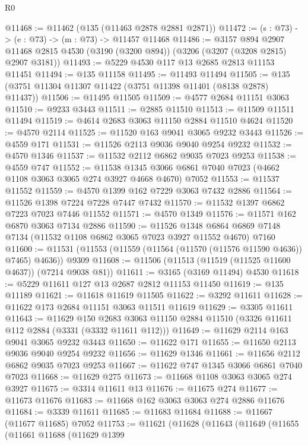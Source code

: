 \begin{lexlean}{R0}
\begin{coremodule}
@11468 := @11462 (@135 (@11463 @2878 @2881 @2871))
@11472 := (s : @73) -> (e : @73) -> (m : @73) -> @11457 @11468
@11486 := @3157
    @894
    @2907
    @11468
    @2815
    @4530
    (@3190 (@3200 @894))
    (@3206 (@3207 (@3208 @2815) @2907 @3181))
@11493 := @5229 @4530 @117 @13 @2685 @2813 @11153 @11451
@11494 := @135 @11158
@11495 := @11493 @11494
@11505 := @135 (@3751 @11304 @11307 @11422 (@3751 @11398 @11401 (@8138 @2878) @11437))
@11506 := @11495 @11505
@11509 := @4577 @2684 @11151 @3063
@11510 := @9233 @3443
@11511 := @2885 @11510
@11513 := @11509 @11511 @11494
@11519 := @4614 @2683 @3063 @11150 @2884 @11510 @4624
@11520 := @4570 @2114
@11525 := @11520 @163 @9041 @3065 @9232 @3443
@11526 := @4559 @171
@11531 := @11526 @2113 @9036 @9040 @9254 @9232
@11532 := @4570 @1346
@11537 := @11532 @2112 @6862 @9035 @7023 @9253
@11538 := @4559 @747
@11552 := @11538
    @1345
    @3066
    @6861
    @7040
    @7023
    (@4662 @1108 @3063 @3065 @274 @3927 @4668 @4670)
    @7052
@11553 := @11537 @11552
@11559 := @4570 @1399 @162 @7229 @3063 @7432 @2886
@11564 := @11526 @1398 @7224 @7228 @7447 @7432
@11570 := @11532 @1397 @6862 @7223 @7023 @7446 @11552
@11571 := @4570 @1349
@11576 := @11571 @162 @6870 @3063 @7134 @2886
@11590 := @11526
    @1348
    @6864
    @6869
    @7148
    @7134
    (@11532 @1108 @6862 @3065 @7023 @3927 @11552 @4670)
    @7160
@11600 := @11531 (@11553 (@11559 (@11564 (@11570 (@11576 @11590 @4636)) @7465) @4636)) @9309
@11608 := @11506 (@11513 (@11519 (@11525 @11600 @4637)) (@7214 @9038 @81))
@11611 := @3165 (@3169 @11494) @4530
@11618 := @5229 @11611 @127 @13 @2687 @2812 @11153 @11450
@11619 := @135 @11189
@11621 := @11618 @11619 @11505
@11622 := @3292 @11611
@11628 := @11622 @173 @2684 @11151 @3063 @11511 @11619
@11629 := @3305 @11611
@11643 := @11629
    @150
    @2683
    @3063
    @11150
    @2884
    @11510
    (@3326 @11611 @112 @2884 (@3331 (@3332 @11611 @112)))
@11649 := @11629 @2114 @163 @9041 @3065 @9232 @3443
@11650 := @11622 @171
@11655 := @11650 @2113 @9036 @9040 @9254 @9232
@11656 := @11629 @1346
@11661 := @11656 @2112 @6862 @9035 @7023 @9253
@11667 := @11622 @747 @1345 @3066 @6861 @7040 @7023
@11668 := @11629 @275
@11673 := @11668 @1108 @3063 @3065 @274 @3927
@11675 := @3314 @11611 @13
@11676 := @11675 @274
@11677 := @11673 @11676
@11683 := @11668 @162 @3063 @3063 @274 @2886 @11676
@11684 := @3339 @11611
@11685 := @11683 @11684
@11688 := @11667 (@11677 @11685) @7052
@11753 := @11621
    (@11628
      (@11643
        (@11649
          (@11655
            (@11661
              @11688
              (@11629
                @1399

\end{coremodule}
\end{lexlean}
